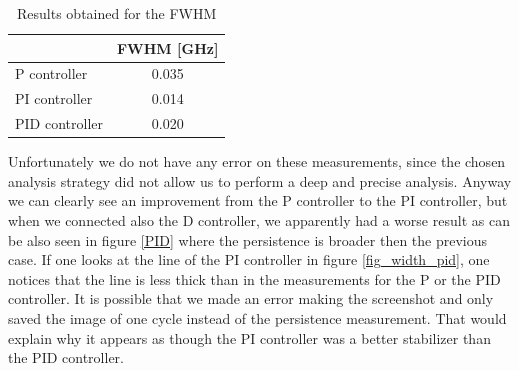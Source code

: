 \documentclass[a4paper,10pt]{article}
\begin{document}
\begin{table}[H]
\centering
\begin{tabular}{l|c}
               & FWHM  {[}GHz{]} \\ \hline
P controller   & 0.035           \\ \hline
PI controller  & 0.014           \\ \hline
PID controller & 0.020           \\ \hline
\end{tabular}
\caption{Results obtained for the FWHM}
\end{table}
Unfortunately we do not have any error on these measurements, since the chosen analysis strategy did not allow us to perform a deep and precise analysis. Anyway we can clearly see an improvement from the P controller to the PI controller, but when we connected also the D controller, we apparently had a worse result as can be also seen in figure \ref{PID} where the persistence is broader then the previous case.
\newline
If one looks at the line of the PI controller in figure \ref{fig_width_pid}, one notices that the line is less thick than in the measurements for the P or the PID controller. It is possible that we made an error making the screenshot and only saved the image of one cycle instead of the persistence measurement. That would explain why it appears as though the PI controller was a better stabilizer than the PID controller.
\end{document}
